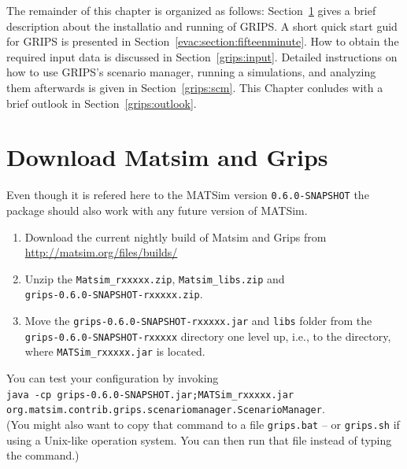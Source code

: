 The remainder of this chapter is organized as follows: Section~\ref{grips:install} gives a brief description about the installatio and running of GRIPS. 
A short quick start guid for GRIPS is presented in Section~\ref{evac:section:fifteenminute}. How to obtain the required input data is discussed in Section~\ref{grips:input}. Detailed instructions on how to use GRIPS's scenario manager, running a simulations, and analyzing them afterwards is given in  Section~\ref{grips:scm}. This Chapter conludes with a brief outlook in Section~\ref{grips:outlook}.


\section{Download Matsim and Grips}\label{grips:install}
Even though it is refered here to the MATSim version \lstinline|0.6.0-SNAPSHOT| the package should also work with any future version of MATSim.
\begin{enumerate}
\item 
Download the current nightly build of Matsim and Grips from
\url{http://matsim.org/files/builds/}
\item 
Unzip the \lstinline|Matsim_rxxxxx.zip|, \lstinline|Matsim_libs.zip| and\\
 \lstinline|grips-0.6.0-SNAPSHOT-rxxxxx.zip|.
\item 
Move the \lstinline|grips-0.6.0-SNAPSHOT-rxxxxx.jar| and \lstinline|libs| folder from the \lstinline|grips-0.6.0-SNAPSHOT-rxxxxx| directory one level up, 
i.e., to the directory, where \lstinline|MATSim_rxxxxx.jar| is located.
\end{enumerate}

You can test your configuration by invoking\\ 
\lstinline|java -cp grips-0.6.0-SNAPSHOT.jar;MATSim_rxxxxx.jar|\\ \lstinline|org.matsim.contrib.grips.scenariomanager.ScenarioManager|.\\
(You might also want to copy that command to a file \lstinline|grips.bat| -- or \lstinline|grips.sh| if using a Unix-like operation system. You can then run that file instead of typing the command.)

